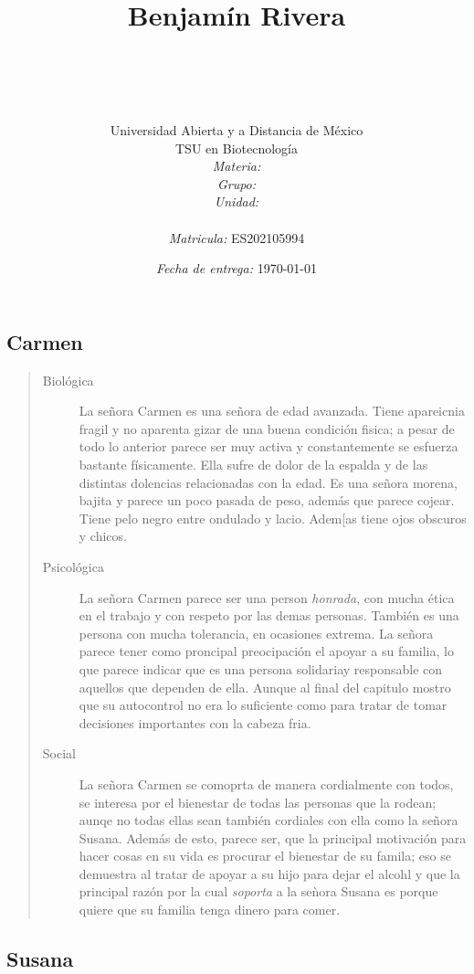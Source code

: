 \documentclass[12pt]{article}
\title{
	\ \\\ \\\
	\ \\ Benjam\'in Rivera \\
	\bf{\titulo}\\\ \\}
\author{
	{\Huge Universidad Abierta y a Distancia de México} \\
	TSU en Biotecnolog\'ia \\
	\textit{Materia:} \materia \\
	\textit{Grupo:} \grupo \\
	\textit{Unidad:} \unidad \\
	\\
	\textit{Matricula:} ES202105994 }
\date{\textit{Fecha de entrega:} \today}
\begin{document}
\maketitle\newpage

\subsection*{Carmen}
	
	\begin{quote}\begin{description} 
		\item [Biol\'ogica] La se\~nora Carmen es una se\~nora de edad avanzada. Tiene apareicnia fragil y no aparenta gizar de una buena condici\'on fisica; a pesar de todo lo anterior parece ser muy activa y constantemente se esfuerza bastante f\'isicamente. Ella sufre de dolor de la espalda y de las distintas dolencias relacionadas con la edad. Es una se\~nora morena, bajita y parece un poco pasada de peso, adem\'as que parece cojear. Tiene pelo negro entre ondulado y lacio. Adem[as tiene ojos obscuros y chicos.
		\item [Psicol\'ogica] La se\~nora Carmen parece ser una person \textit{honrada}, con mucha \'etica en el trabajo y con respeto por las demas personas. Tambi\'en es una persona con mucha tolerancia, en ocasiones extrema. La se\~nora parece tener como proncipal preocipaci\'on el apoyar a su familia, lo que parece indicar que es una persona solidariay responsable con aquellos que dependen de ella. Aunque al final del capitulo mostro que su autocontrol no era lo suficiente como para tratar de tomar decisiones importantes con la cabeza fria.
		\item [Social] La se\~nora Carmen se comoprta de manera cordialmente con todos, se interesa por el bienestar de todas las personas que la rodean; aunqe no todas ellas sean tambi\'en cordiales con ella como la se\~nora Susana. Adem\'as de esto, parece ser, que la principal motivaci\'on para hacer cosas en su vida es procurar el bienestar de su famila; eso se demuestra al tratar de apoyar a su hijo para dejar el alcohl y que la principal raz\'on por la cual \textit{soporta} a la se\`nora Susana es porque quiere que su familia tenga dinero para comer.
	\end{description}\end{quote}


\subsection*{Susana}
	
\end{document}
